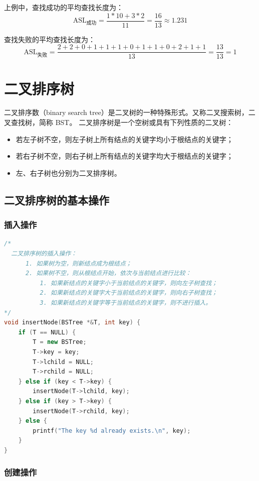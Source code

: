 \documentclass[lang=cn,newtx,10pt,scheme=chinese]{elegantbook}
\begin{document}
上例中，查找成功的平均查找长度为：
\[
\text{ASL}_{\text{成功}} = \frac{1*10+3*2}{11} = \frac{16}{13} \approx 1.231
\]

查找失败的平均查找长度为：
\[
\text{ASL}_{\text{失败}} = \frac{2+2+0+1+1+1+0+1+1+0+2+1+1}{13} = \frac{13}{13} = 1
\]
\section{二叉排序树}

二叉排序数（binary search tree）是二叉树的一种特殊形式。又称二叉搜索树，二叉查找树，简称 BST。
二叉排序树是一个空树或具有下列性质的二叉树：

\begin{itemize}
  \item 若左子树不空，则左子树上所有结点的关键字均小于根结点的关键字；
  \item 若右子树不空，则右子树上所有结点的关键字均大于根结点的关键字；
  \item 左、右子树也分别为二叉排序树。
  \end{itemize}


  \subsection{二叉排序树的基本操作}

\subsubsection{插入操作}

\begin{lstlisting}[language=C++, caption={二叉排序树的插入操作}]
  /*
  二叉排序树的插入操作：
      1. 如果树为空，则新结点成为根结点；
      2. 如果树不空，则从根结点开始，依次与当前结点进行比较：
          1. 如果新结点的关键字小于当前结点的关键字，则向左子树查找；
          2. 如果新结点的关键字大于当前结点的关键字，则向右子树查找；
          3. 如果新结点的关键字等于当前结点的关键字，则不进行插入。
*/
void insertNode(BSTree *&T, int key) {
    if (T == NULL) {
        T = new BSTree;
        T->key = key;
        T->lchild = NULL;
        T->rchild = NULL;
    } else if (key < T->key) {
        insertNode(T->lchild, key);
    } else if (key > T->key) {
        insertNode(T->rchild, key);
    } else {
        printf("The key %d already exists.\n", key);
    }
}
\end{lstlisting}



\subsubsection{创建操作}
\end{document}
